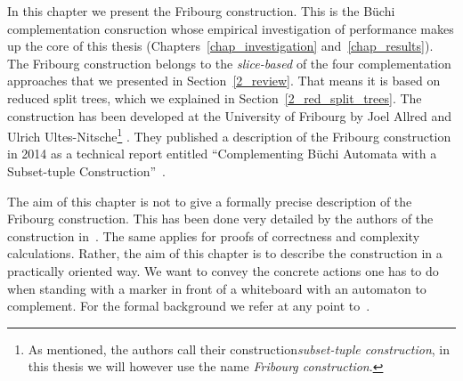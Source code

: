 In this chapter we present the Fribourg construction. This is the Büchi complementation consruction whose  empirical investigation of performance makes up the core of this thesis (Chapters~\ref{chap_investigation} and~\ref{chap_results}). The Fribourg construction belongs to the \textit{slice-based} of the four complementation approaches that we presented in Section~\ref{2_review}. That means it is based on reduced split trees, which we explained in Section~\ref{2_red_split_trees}. The construction has been developed at the University of Fribourg by Joel Allred and Ulrich Ultes-Nitsche\footnote{As mentioned, the authors call their construction\textit{subset-tuple construction}, in this thesis we will however use the name \textit{Fribourg construction}.} . They published a description of the Fribourg construction in 2014 as a technical report entitled ``Complementing Büchi Automata with a Subset-tuple Construction''~\cite{2014_joel_ulrich}.

The aim of this chapter is not to give a formally precise description of the Fribourg construction. This has been done very detailed by the authors of the construction in~\cite{2014_joel_ulrich}. The same applies for proofs of correctness and complexity calculations. Rather, the aim of this chapter is to describe the construction in a practically oriented way. We want to convey the concrete actions one has to do when standing with a marker in front of a whiteboard with an automaton to complement. For the formal background we refer at any point to~\cite{2014_joel_ulrich}.







